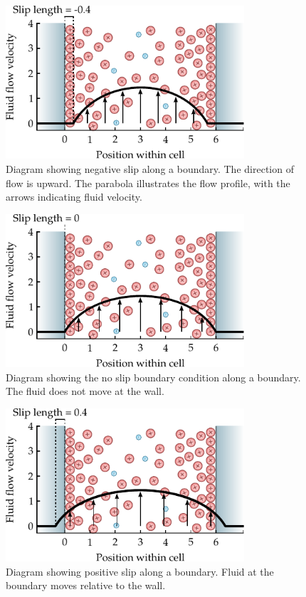     \begin{figure}
      \centering
      \includegraphics[width=251.6pt]{content/background/graphics/HydrodynamicSlip_negativeLength}
      \caption[Diagram showing hydrodynamic slip inside a channel cavity.]{\label{fig:HydrodynamicSlip_negative}Diagram showing negative slip along a boundary. The direction of flow is upward. The parabola illustrates the flow profile, with the arrows indicating fluid velocity.}
    \end{figure}
    \begin{figure}
      \centering
      \includegraphics[width=251.6pt]{content/background/graphics/HydrodynamicSlip_zeroLength}
      \caption[Diagram showing hydrodynamic slip inside a channel cavity.]{\label{fig:HydrodynamicSlip_zero}Diagram showing the no slip boundary condition along a boundary. The fluid does not move at the wall.}
    \end{figure}
    \begin{figure}
      \centering
      \includegraphics[width=251.6pt]{content/background/graphics/HydrodynamicSlip_positiveLength}
      \caption[Diagram showing hydrodynamic slip inside a channel cavity.]{\label{fig:HydrodynamicSlip_positive}Diagram showing positive slip along a boundary. Fluid at the boundary moves relative to the wall.}
    \end{figure}

